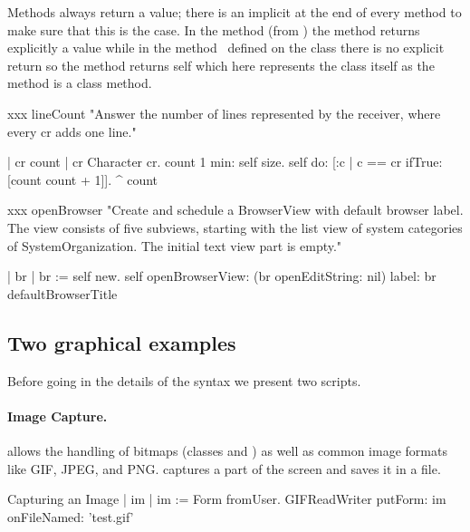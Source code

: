 \documentclass[a4paper,10pt,twoside]{book}
\begin{document}
Methods always return a value; there is an implicit  at the end of every method to make sure that this is the case. In the method  (from ) the method returns explicitly a value while in the method~ defined on the class  there is no
explicit return so the method returns self which here represents the class itself as the method is a class method. 

\begin{method}[xxx]{xxx}\label{mth:lineCount2}
lineCount
   "Answer the number of lines represented by the receiver, where every
   cr adds one line."
    
   | cr count |
   cr  Character cr.
   count  1  min: self size.
   self do:
      [:c | c == cr ifTrue: [count  count + 1]].
   ^ count
\end{method}

\begin{method}[xxx]{xxx}\label{mth:openbrowser}
openBrowser
   "Create and schedule a BrowserView with default browser label. The
   view consists of five subviews, starting with the list view of system
   categories of SystemOrganization. The initial text view part is empty."

   | br |
   br := self new.
   self
      openBrowserView: (br openEditString: nil)
      label: br defaultBrowserTitle
\end{method}


\subsection{Two graphical examples}


Before going in the details of the syntax we present two scripts. 

\paragraph{Image Capture.}
\sq allows the handling of bitmaps (classes  and ) as well as common image formats like GIF, JPEG, and PNG.  captures a part of the screen and saves it in a file.

\begin{script}{Capturing an Image}\label{scr:capt}
| im |
im := Form fromUser.
GIFReadWriter putForm: im onFileNamed: 'test.gif'
\end{script}
\end{document}
